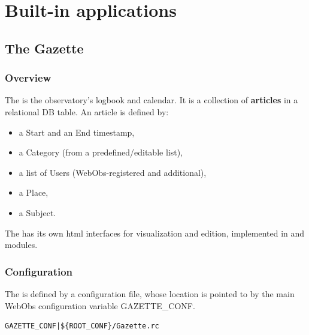 

\chapter{Built-in applications}
\label{builtin}

\section{The Gazette}

\subsection{Overview}

The  is the observatory's logbook and calendar. It is a collection 
of \textbf{articles} in a relational DB table. An article is defined by: 
\begin{itemize}
\item a Start and an End timestamp,
\item a Category (from a predefined/editable list),
\item a list of Users (WebObs-registered and additional),
\item a Place,
\item a Subject.
\end{itemize}

The  has its own html interfaces for visualization and edition, implemented
in  and  modules.

\subsection{Configuration}

The  is defined by a configuration file,
whose location is pointed to by the main WebObs configuration variable
GAZETTE\_CONF.

\begin{lstlisting}[title=\wofile{WEBOBS.rc} (excerpt)]
GAZETTE_CONF|${ROOT_CONF}/Gazette.rc
\end{lstlisting}

